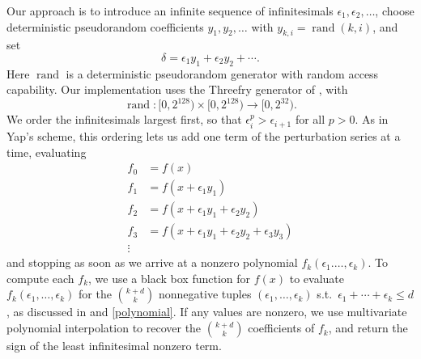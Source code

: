 \documentclass[11pt]{article}
\newcommand{\rand}{\operatorname{rand}}
\begin{document}
Our approach is to introduce an infinite sequence of infinitesimals $\epsilon_1, \epsilon_2, \ldots$, choose deterministic pseudorandom coefficients $y_1, y_2, \ldots$
with $y_{k,i} = \rand(k,i)$, and set
$$\delta = \epsilon_1 y_1 + \epsilon_2 y_2 + \cdots.$$
Here $\rand$ is a deterministic pseudorandom generator with random access capability.  Our implementation uses the Threefry generator of
\cite{salmon2011random}, with
$$\rand : [0,2^{128}) \times [0,2^{128}) \to [0,2^{32}).$$
We order the infinitesimals largest first, so that $\epsilon_i^p > \epsilon_{i+1}$ for all $p > 0$.  As in Yap's scheme, this ordering lets us add one term of the
perturbation series at a time, evaluating
\begin{align*}
f_0 &= f(x) \\
f_1 &= f(x + \epsilon_1 y_1) \\
f_2 &= f(x + \epsilon_1 y_1 + \epsilon_2 y_2) \\
f_3 &= f(x + \epsilon_1 y_1 + \epsilon_2 y_2 + \epsilon_3 y_3) \\
\vdots
\end{align*}
and stopping as soon as we arrive at a nonzero polynomial $f_k(\epsilon_1. \ldots, \epsilon_k)$.
To compute each $f_k$, we use a black box function for $f(x)$ to evaluate $f_k(\epsilon_1, \ldots, \epsilon_k)$ for the $\binom{k+d}{k}$ nonnegative tuples $(\epsilon_1, \ldots, \epsilon_k)$
s.t.\ $\epsilon_1 + \cdots + \epsilon_k \le d$, as discussed in \cite{neidinger2009multivariable} and \autoref{polynomial}.  If any values are nonzero, we use multivariate
polynomial interpolation to recover the $\binom{k+d}{k}$ coefficients of $f_k$, and return the sign of the least infinitesimal nonzero term.
\end{document}
